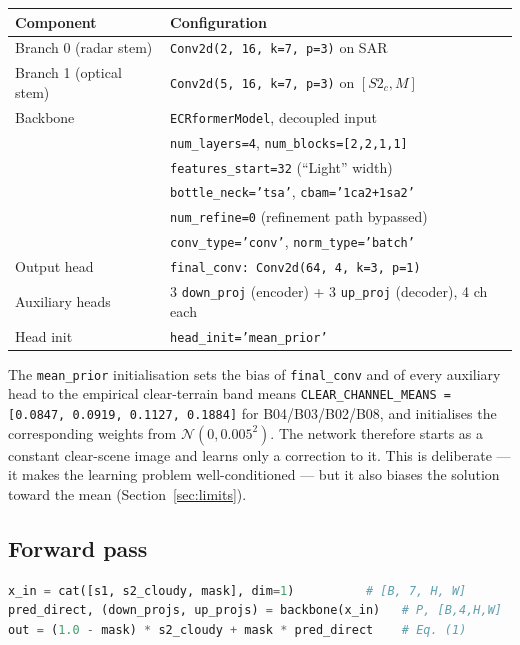 \documentclass[10pt,a4paper]{article}
\newcommand{\code}[1]{\texttt{#1}}
\begin{document}
\begin{center}
\begin{tabular}{@{}ll@{}}
\hline
Component & Configuration \\
\hline
Branch 0 (radar stem) & \code{Conv2d(2, 16, k=7, p=3)} on SAR \\
Branch 1 (optical stem) & \code{Conv2d(5, 16, k=7, p=3)} on $[S2_c, M]$ \\
Backbone & \code{ECRformerModel}, decoupled input \\
  & \code{num\_layers=4}, \code{num\_blocks=[2,2,1,1]} \\
  & \code{features\_start=32} (``Light'' width) \\
  & \code{bottle\_neck='tsa'}, \code{cbam='1ca2+1sa2'} \\
  & \code{num\_refine=0} (refinement path bypassed) \\
  & \code{conv\_type='conv'}, \code{norm\_type='batch'} \\
Output head & \code{final\_conv: Conv2d(64, 4, k=3, p=1)} \\
Auxiliary heads & 3 \code{down\_proj} (encoder) + 3 \code{up\_proj} (decoder), 4 ch each \\
Head init & \code{head\_init='mean\_prior'} \\
\hline
\end{tabular}
\end{center}

The \code{mean\_prior} initialisation sets the bias of \code{final\_conv} and of every auxiliary
head to the empirical clear-terrain band means
\code{CLEAR\_CHANNEL\_MEANS = [0.0847, 0.0919, 0.1127, 0.1884]} for B04/B03/B02/B08, and initialises
the corresponding weights from $\mathcal{N}(0, 0.005^2)$. The network therefore starts as a
constant clear-scene image and learns only a correction to it. This is deliberate --- it makes the
learning problem well-conditioned --- but it also biases the solution toward the mean
(Section~\ref{sec:limits}).

\subsection{Forward pass}

\begin{lstlisting}[language=Python]
x_in = cat([s1, s2_cloudy, mask], dim=1)          # [B, 7, H, W]
pred_direct, (down_projs, up_projs) = backbone(x_in)   # P, [B,4,H,W]
out = (1.0 - mask) * s2_cloudy + mask * pred_direct    # Eq. (1)
\end{lstlisting}
\end{document}
